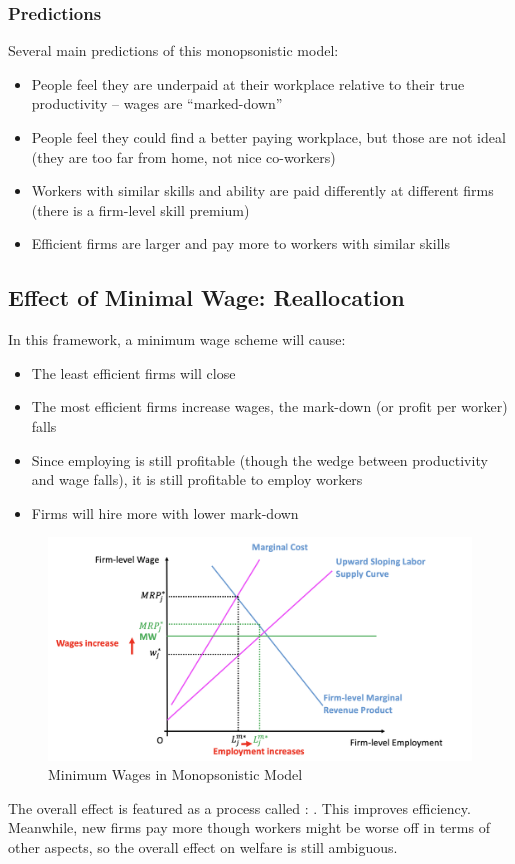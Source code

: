         \subsubsection{Predictions}
            Several main predictions of this monopsonistic model:
            \begin{itemize}
                \item People feel they are underpaid at their workplace relative to their true productivity – wages are “marked-down”
                \item People feel they could find a better paying workplace, but those are not ideal (they are too far from home, not nice co-workers)
                \item Workers with similar skills and ability are paid differently at different firms (there is a firm-level skill premium)
                \item Efficient firms are larger and pay more to workers with similar skills
            \end{itemize}
    
    \subsection{Effect of Minimal Wage: Reallocation}
        In this framework, a minimum wage scheme will cause:
        \begin{itemize}
            \item The least efficient firms will close
            \item The most efficient firms increase wages, the mark-down (or profit per worker) falls
            \item Since employing is still profitable (though the wedge between productivity and wage falls), it is still profitable to employ workers
            \item Firms will hire more with lower mark-down
        \end{itemize}
        \begin{figure}[H]
            \centering
            \includegraphics[width=5in]{images/ch2/Monop_LM_2.png}
            \caption{Minimum Wages in Monopsonistic Model}
        \end{figure}
        The overall effect is featured as a process called : . This improves efficiency. Meanwhile, new firms pay more though workers might be worse off in terms of other aspects, so the overall effect on welfare is still ambiguous.
        
